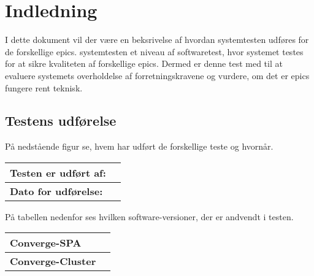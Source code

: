 \chapter{Indledning}
I dette dokument vil der være en beksrivelse af hvordan systemtesten udføres for de forskellige epics. 
systemtesten et niveau af softwaretest, hvor systemet testes for at sikre kvaliteten af forskellige epics. Dermed er denne test med til at evaluere systemets overholdelse af forretningskravene og vurdere, om det er epics fungere rent teknisk.

\section{Testens udførelse}

På nedstående figur se, hvem har udført de forskellige teste og hvornår. 

\begin{table}[H]
	\centering
	\begin{tabular}{l|L{300px}}
		\hline
		\textbf{Testen er udført af:} & \\[20px]
		\hline
		\textbf{Dato for udførelse:} & \\[20px]
		\hline
	\end{tabular}
	\label{tab:TableLabel}
\end{table}

På tabellen nedenfor ses hvilken software-versioner, der er andvendt i testen. 

\begin{table}[H]
	\centering
    \begin{tabular}{l|L{300px}}
        \hline
		\textbf{Converge-SPA} & \\[20px]
		\hline
		\textbf{Converge-Cluster} & \\[20px]
		\hline
	\end{tabular}
	\label{tab:TableLabel}
\end{table}


